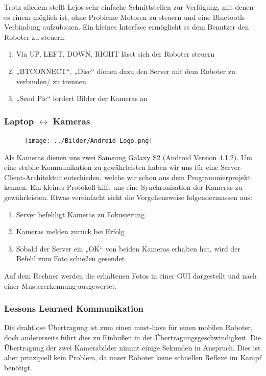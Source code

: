 \documentclass[12pt,a4paper]{article}
\begin{document}
Trotz alledem stellt Lejos sehr einfache Schnittstellen zur Verfügung, mit denen es einem möglich ist, ohne Probleme Motoren zu steuern und eine Bluetooth-Verbindung aufzubauen.
Ein kleines Interface ermöglicht es dem Benutzer den Roboter zu steuern:
\begin{enumerate}
\item Via UP, LEFT, DOWN, RIGHT lässt sich der Roboter steuern
\item „BTCONNECT“, „Disc“ dienen dazu den Server mit dem Roboter zu verbinden/ zu trennen.
\item „Send Pic“ fordert Bilder der Kameras an
\end{enumerate}
\newpage


\subsubsection*{Laptop $\leftrightarrow$ Kameras}
\begin{figure}
  \vspace{-40pt}
  \begin{center}
    \texttt{[image: ../Bilder/Android-Logo.png]}
  \end{center}
  \vspace{-20pt}
\end{figure}
Als Kameras dienen uns zwei Samsung Galaxy S2 (Android Version 4.1.2).
Um eine stabile Kommunikation zu gewährleisten haben wir uns für eine Server-Client-Architektur entschieden, welche wir schon aus dem Programmierprojekt kennen.
Ein kleines Protokoll hilft uns eine Synchronisation der Kameras zu gewährleisten.
Etwas vereinfacht sieht die Vorgehensweise folgendermassen aus:
\begin{enumerate}
\item
Server befehligt Kameras zu Fokusierung
\item
Kameras melden zurück bei Erfolg
\item
Sobald der Server ein „OK“ von beiden Kameras erhalten hat, wird der Befehl zum Foto schießen gesendet
\end{enumerate}

Auf dem Rechner werden die erhaltenen Fotos in einer GUI dargestellt und nach einer Mustererkennung ausgewertet.

\subsubsection*{Lessons Learned Kommunikation}
Die drahtlose Übertragung ist zum einen must-have für einen mobilen Roboter, doch andererseits führt dies zu Einbußen in der Übertragungsgeschwindigkeit. Die Übertragung der zwei Kamerabilder nimmt einige Sekunden in Anspruch. Dies ist aber prinzipiell kein Problem, da unser Roboter keine schnellen Reflexe im Kampf benötigt.
\end{document}
